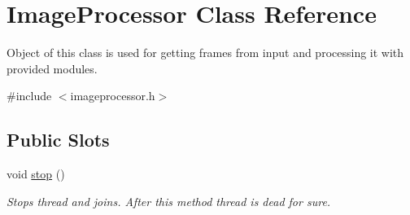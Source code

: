 \hypertarget{class_image_processor}{
\section{ImageProcessor Class Reference}
\label{de/d7d/class_image_processor}
}


Object of this class is used for getting frames from input and processing it with provided modules.  




{\ttfamily \#include $<$imageprocessor.h$>$}

\subsection*{Public Slots}
\begin{DoxyCompactItemize}
\item 
\hypertarget{class_image_processor_a9759fb0e904d60f127ce864ce89422ff}{
void \hyperlink{class_image_processor_a9759fb0e904d60f127ce864ce89422ff}{stop} ()}
\label{de/d7d/class_image_processor_a9759fb0e904d60f127ce864ce89422ff}

\begin{DoxyCompactList}\small\item\em Stops thread and joins. After this method thread is dead for sure. \item\end{DoxyCompactList}\end{DoxyCompactItemize}
